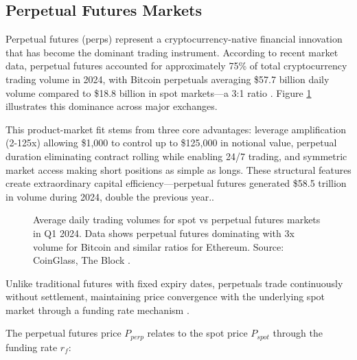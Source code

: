 \documentclass{report}
\begin{document}
\subsection{Perpetual Futures Markets}

Perpetual futures (perps) represent a cryptocurrency-native financial innovation that has become the dominant trading instrument. According to recent market data, perpetual futures accounted for approximately 75\% of total cryptocurrency trading volume in 2024, with Bitcoin perpetuals averaging \$57.7 billion daily volume compared to \$18.8 billion in spot markets—a 3:1 ratio \cite{CoinGecko2024}. Figure \ref{fig:perp_vs_spot} illustrates this dominance across major exchanges.

This product-market fit stems from three core advantages: leverage amplification (2-125x) allowing \$1,000 to control up to \$125,000 in notional value, perpetual duration eliminating contract rolling while enabling 24/7 trading, and symmetric market access making short positions as simple as longs. These structural features create extraordinary capital efficiency—perpetual futures generated \$58.5 trillion in volume during 2024, double the previous year.\cite{CoinGecko2024}.

\begin{figure}[h]
\centering
{}
\caption{Average daily trading volumes for spot vs perpetual futures markets in Q1 2024. Data shows perpetual futures dominating with 3x volume for Bitcoin and similar ratios for Ethereum. Source: CoinGlass, The Block \cite{CoinGecko2024}.}
\label{fig:perp_vs_spot}
\end{figure}

Unlike traditional futures with fixed expiry dates, perpetuals trade continuously without settlement, maintaining price convergence with the underlying spot market through a funding rate mechanism \cite{HyperliquidDocs2024}.

The perpetual futures price $P_{perp}$ relates to the spot price $P_{spot}$ through the funding rate $r_f$:
\end{document}
